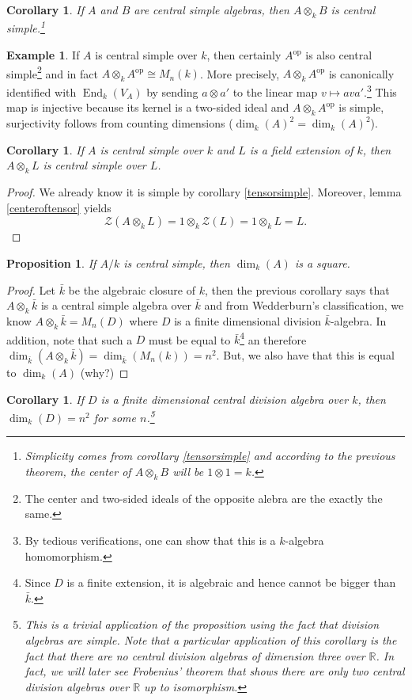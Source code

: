 \documentclass{tufte-handout} %
\newtheorem{cor}[thm]{Corollary}
\newtheorem{prop}[thm]{Proposition}
\theoremstyle{definition}
\newtheorem{exmp}[thm]{Example}
\theoremstyle{remark}
\newcommand{\op}[1]{#1^{\text{op}}}
\newcommand{\R}{\mathbb{R}}
\newcommand{\mZ}{\mathcal{Z}}
\DeclareMathOperator{\End}{End}
\begin{document}
\begin{cor}\label{tensorcentsimple}
	If $A$ and $B$ are central simple algebras, then $A \otimes_k B$ is central simple.\footnote{Simplicity comes from corollary \ref{tensorsimple} and according to the previous theorem, the center of $A \otimes_k B$ will be $1 \otimes 1 = k$.}
\end{cor}
\begin{exmp}\label{AtensAop}
	If $A$ is central simple over $k$, then certainly $\op{A}$ is also central simple\footnote{The center and two-sided ideals of the opposite alebra are the exactly the same.} and in fact $A \otimes_k \op{A} \cong M_n(k)$. More precisely, $A \otimes_k \op{A}$ is canonically identified with $\End_k(V_A)$ by sending $a \otimes a'$ to the linear map $v \mapsto ava'$.\footnote{By tedious verifications, one can show that this is a $k$-algebra homomorphism.} This map is injective because its kernel is a two-sided ideal and $A \otimes_k \op{A}$ is simple, surjectivity follows from counting dimensions ($\dim_k(A)^2 = \dim_k(A)^2$).
\end{exmp}
\begin{cor}
	If $A$ is central simple over $k$ and $L$ is a field extension of $k$, then $A\otimes_k L$ is central simple over $L$.
\end{cor}
\begin{proof}
	We already know it is simple by corollary \ref{tensorsimple}. Moreover, lemma \ref{centeroftensor} yields \[\mZ(A \otimes_k L) = 1 \otimes_k \mZ(L) = 1 \otimes_k L = L.\]
\end{proof}
\begin{prop}
	If $A/k$ is central simple, then $\dim_k(A)$ is a square.
\end{prop}
\begin{proof}
	Let $\bar{k}$ be the algebraic closure of $k$, then the previous corollary says that $A \otimes_k \bar{k}$ is a central simple algebra over $\bar{k}$ and from Wedderburn's classification, we know $A \otimes_k \bar{k}= M_n(D)$ where $D$ is a finite dimensional division $\bar{k}$-algebra. In addition, note that such a $D$ must be equal to $\bar{k}$\footnote{Since $D$ is a finite extension, it is algebraic and hence cannot be bigger than $\bar{k}$.} an therefore $\dim_{\bar{k}}(A \otimes_k \bar{k}) = \dim_{\bar{k}}(M_n(k)) = n^2$. But, we also have that this is equal to $\dim_k(A)$ (why?) %
\end{proof}
\begin{cor}
	If $D$ is a finite dimensional central division algebra over $k$, then $\dim_k(D) = n^2$ for some $n$.\footnote{This is a trivial application of the proposition using the fact that division algebras are simple. Note that a particular application of this corollary is the fact that there are no central division algebras of dimension three over $\R$. In fact, we will later see Frobenius' theorem that shows there are only two central division algebras over $\R$ up to isomorphism.}
\end{cor}
\end{document}
